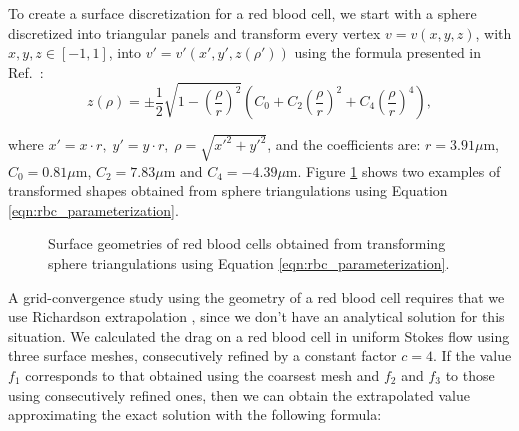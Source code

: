\documentclass[final,3p,times]{elsarticle}
\begin{document}
To create a surface discretization for a red blood cell, we start with a sphere discretized into triangular panels and transform every vertex $v = v(x,y,z)$, with $x,y,z\in [-1,1]$, into $v' = v'(x',y',z(\rho'))$ using the formula presented in Ref.~\cite{EvansFung1972}:
%
\begin{equation}
	\label{eqn:rbc_parameterization}
	z(\rho) = \pm \frac{1}{2}\sqrt{1 - \left(\frac{\rho}{r}\right)^{2}}\left ( C_0 + C_2 \left(\frac{\rho}{r}\right)^{2} + C_4\left(\frac{\rho}{r}\right)^{4}\right ),
\end{equation}

\noindent where $x' = x\cdot r,\; y' = y\cdot r,\; \rho = \sqrt{x'^{2}+y'^{2}}$, and the coefficients are: $r=3.91\mu$m,  $C_0= 0.81\mu$m, $C_2= 7.83\mu$m and $C_4=-4.39\mu$m.
Figure \ref{fig:glob_rbc} shows two examples of transformed shapes obtained from sphere triangulations using Equation \eqref{eqn:rbc_parameterization}.


\begin{figure}%
\begin{center}
	\qquad
	\caption{Surface geometries of red blood cells obtained from transforming sphere triangulations using Equation \eqref{eqn:rbc_parameterization}.}
	\label{fig:glob_rbc}
\end{center}
\end{figure}

A grid-convergence study using the geometry of a red blood cell requires that we use Richardson extrapolation \cite{roache1998}, since we don't have an analytical solution for this situation. We calculated the drag on a red blood cell in uniform Stokes flow using three surface meshes, consecutively refined by a constant factor $c=4$. 
If the value $f_1$ corresponds to that obtained using the coarsest mesh and $f_2$ and $f_3$ to those using consecutively refined ones, then we can obtain the extrapolated value approximating the exact solution with the following formula:
\end{document}
